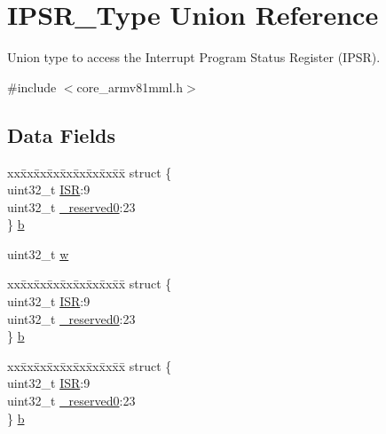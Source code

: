 \hypertarget{union_i_p_s_r___type}{}\section{I\+P\+S\+R\+\_\+\+Type Union Reference}
\label{union_i_p_s_r___type}


Union type to access the Interrupt Program Status Register (I\+P\+SR).  




{\ttfamily \#include $<$core\+\_\+armv81mml.\+h$>$}

\subsection*{Data Fields}
\begin{DoxyCompactItemize}
\item 
\begin{tabbing}
xx\=xx\=xx\=xx\=xx\=xx\=xx\=xx\=xx\=\kill
struct \{\\
\>uint32\_t \mbox{\hyperlink{union_i_p_s_r___type_ad502ba7dbb2aab5f87c782b28f02622d}{ISR}}:9\\
\>uint32\_t \mbox{\hyperlink{union_i_p_s_r___type_ac8a6a13838a897c8d0b8bc991bbaf7c1}{\_reserved0}}:23\\
\} \mbox{\hyperlink{union_i_p_s_r___type_a3758147356a15906221a5625a27d9048}{b}}\\

\end{tabbing}\item 
uint32\+\_\+t \mbox{\hyperlink{union_i_p_s_r___type_ad0fb62e7a08e70fc5e0a76b67809f84b}{w}}
\item 
\begin{tabbing}
xx\=xx\=xx\=xx\=xx\=xx\=xx\=xx\=xx\=\kill
struct \{\\
\>uint32\_t \mbox{\hyperlink{union_i_p_s_r___type_ad502ba7dbb2aab5f87c782b28f02622d}{ISR}}:9\\
\>uint32\_t \mbox{\hyperlink{union_i_p_s_r___type_ac8a6a13838a897c8d0b8bc991bbaf7c1}{\_reserved0}}:23\\
\} \mbox{\hyperlink{union_i_p_s_r___type_ad36fa78590879fac0e448d2b83be9034}{b}}\\

\end{tabbing}\item 
\begin{tabbing}
xx\=xx\=xx\=xx\=xx\=xx\=xx\=xx\=xx\=\kill
struct \{\\
\>uint32\_t \mbox{\hyperlink{union_i_p_s_r___type_ad502ba7dbb2aab5f87c782b28f02622d}{ISR}}:9\\
\>uint32\_t \mbox{\hyperlink{union_i_p_s_r___type_ac8a6a13838a897c8d0b8bc991bbaf7c1}{\_reserved0}}:23\\
\} \mbox{\hyperlink{union_i_p_s_r___type_ac424c5b49a721a7dbf69205402156fc9}{b}}\\


\end{tabbing}
\end{DoxyCompactItemize}
